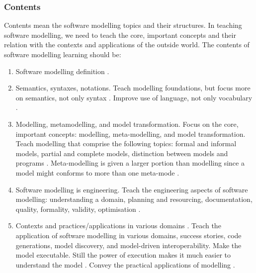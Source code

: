 \documentclass[12pt, a4paper]{report}
\begin{document}
\subsubsection{Contents}
Contents mean the software modelling topics and their structures. In teaching software modelling, we need to teach the core, important concepts and their relation with the contexts and applications of the outside world. The contents of software modelling learning should be:
\begin{enumerate}
\item Software modelling definition \cite{borstler2012teaching}.
\item Semantics, syntaxes, notations. Teach modelling foundations, but focus more on semantics, not only syntax \cite{borstler2012teaching}. Improve use of language, not only vocabulary \cite{bezivin2009teaching}.
\item Modelling, metamodelling, and model transformation. Focus on the core, important concepts: modelling, meta-modelling, and model transformation. Teach modelling that comprise the following topics: formal and informal models, partial and complete models, distinction between models and programs \cite{bezivin2009teaching}. Meta-modelling is given a larger portion than modelling since a model might conforms to more than one meta-mode \cite{ober2007teaching}.
\item Software modelling is engineering. Teach the engineering aspects of software modelling: understanding a domain, planning and resourcing, documentation, quality, formality, validity, optimisation \cite{paige2014bad}.
\item Contexts and practices/applications in various domains \cite{paige2014bad}. Teach the application of software modelling in various domains, success stories, code generations, model discovery, and model-driven interoperability. Make the model executable. Still the power of execution makes it much easier to understand the model \cite{bezivin2009teaching}. Convey the practical applications of modelling \cite{borstler2012teaching}.
\end{enumerate}
\end{document}
